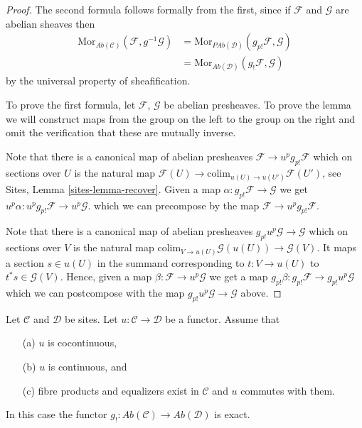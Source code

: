 \begin{proof}
The second formula follows formally from the first, since if
$\mathcal{F}$ and $\mathcal{G}$ are abelian sheaves then
\begin{align*}
\text{Mor}_{\textit{Ab}(\mathcal{C})}(\mathcal{F}, g^{-1}\mathcal{G})
& =
\text{Mor}_{\textit{PAb}(\mathcal{D})}(g_{p!}\mathcal{F}, \mathcal{G}) \\
& =
\text{Mor}_{\textit{Ab}(\mathcal{D})}(g_!\mathcal{F}, \mathcal{G})
\end{align*}
by the universal property of sheafification.

\medskip\noindent
To prove the first formula, let $\mathcal{F}$, $\mathcal{G}$ be abelian
presheaves. To prove the lemma we will construct maps from the group on the
left to the group on the right and omit the verification that these are
mutually inverse.

\medskip\noindent
Note that there is a canonical map of abelian presheaves
$\mathcal{F} \to u^pg_{p!}\mathcal{F}$ which on sections over $U$ is the
natural map
$\mathcal{F}(U) \to \text{colim}_{u(U) \to u(U')} \mathcal{F}(U')$, see
Sites, Lemma \ref{sites-lemma-recover}. 
Given a map $\alpha : g_{p!}\mathcal{F} \to \mathcal{G}$
we get $u^p\alpha : u^pg_{p!}\mathcal{F} \to u^p\mathcal{G}$.
which we can precompose by the map $\mathcal{F} \to u^pg_{p!}\mathcal{F}$.

\medskip\noindent
Note that there is a canonical map of abelian presheaves
$g_{p!}u^p\mathcal{G} \to \mathcal{G}$ which on sections over
$V$ is the natural map
$\text{colim}_{V \to u(U)} \mathcal{G}(u(U)) \to \mathcal{G}(V)$.
It maps a section $s \in u(U)$ in the summand corresponding to
$t : V \to u(U)$ to $t^*s \in \mathcal{G}(V)$.
Hence, given a map $\beta : \mathcal{F} \to u^p\mathcal{G}$
we get a map $g_{p!}\beta : g_{p!}\mathcal{F} \to g_{p!}u^p\mathcal{G}$
which we can postcompose with the map $g_{p!}u^p\mathcal{G} \to \mathcal{G}$
above.
\end{proof}

\begin{lemma}
\label{lemma-exactness-lower-shriek}
Let $\mathcal{C}$ and $\mathcal{D}$ be sites.
Let $u : \mathcal{C} \to \mathcal{D}$ be a functor.
Assume that
\begin{enumerate}
\item[(a)] $u$ is cocontinuous,
\item[(b)] $u$ is continuous, and
\item[(c)] fibre products and equalizers exist in $\mathcal{C}$ and
$u$ commutes with them.
\end{enumerate}
In this case the functor
$g_! : \textit{Ab}(\mathcal{C}) \to \textit{Ab}(\mathcal{D})$
is exact.
\end{lemma}

